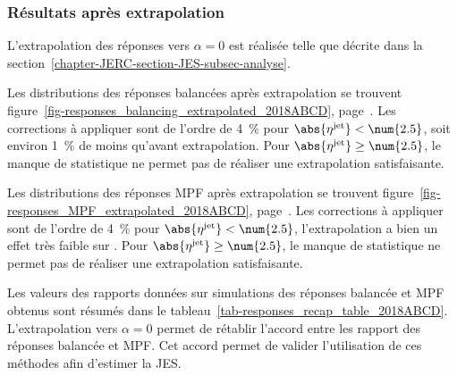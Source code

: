 \subsubsection{Résultats après extrapolation}\label{chapter-JERC-section-JES-subsec-results-subsubsec-after_extrap}
L'extrapolation des réponses vers $\alpha=0$ est réalisée telle que décrite dans la section~\ref{chapter-JERC-section-JES-subsec-analyse}.
\par Les distributions des réponses balancées après extrapolation se trouvent figure~\ref{fig-responses_balancing_extrapolated_2018ABCD}, page~\pageref{fig-responses_balancing_extrapolated_2018ABCD}.
Les corrections à appliquer sont de l'ordre de \SI{4}{\%} pour $\abs{\eta^\text{jet}} < \num{2.5}$, soit environ \SI{1}{\%} de moins qu'avant extrapolation.
Pour $\abs{\eta^\text{jet}}\geq\num{2.5}$, le manque de statistique ne permet pas de réaliser une extrapolation satisfaisante.
\par Les distributions des réponses MPF après extrapolation se trouvent figure~\ref{fig-responses_MPF_extrapolated_2018ABCD}, page~\pageref{fig-responses_MPF_extrapolated_2018ABCD}.
Les corrections à appliquer sont de l'ordre de \SI{4}{\%} pour $\abs{\eta^\text{jet}} < \num{2.5}$, l'extrapolation a bien un effet très faible sur \RMPF.
Pour $\abs{\eta^\text{jet}}\geq\num{2.5}$, le manque de statistique ne permet pas de réaliser une extrapolation satisfaisante.
\par Les valeurs des rapports données sur simulations des réponses balancée et MPF obtenus sont résumés dans le tableau~\ref{tab-responses_recap_table_2018ABCD}.
L'extrapolation vers $\alpha=0$ permet de rétablir l'accord entre les rapport des réponses balancée et MPF.
Cet accord permet de valider l'utilisation de ces méthodes afin d'estimer la JES.








